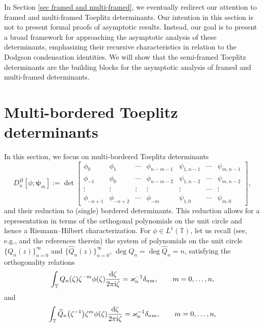 \documentclass[10pt,a4paper]{amsart}
\numberwithin{equation}{section}
\newcommand{\T}{{\mathbb T}}
\newcommand{\de}{\delta}
\newcommand{\ze}{\zeta}
\newcommand{\ii}{{\rm i}}
\newcommand{\dd}{{\rm d}}
\begin{document}
	
	In Section \ref{sec framed and multi-framed}, we eventually redirect our attention to framed and multi-framed Toeplitz determinants. Our intention in this section is not to present formal proofs of asymptotic results. Instead, our goal is to present a broad framework for approaching the asymptotic analysis of these determinants, emphasizing their recursive characteristics in relation to the Dodgson condensation identities. We will show that the semi-framed Toeplitz determinants are the building blocks for the asymptotic analysis of framed and multi-framed determinants.
	

\section{Multi-bordered Toeplitz determinants} \label{sec bordered}
	In this section, we focus on multi-bordered Toeplitz determinants
	\begin{equation}\label{btdmulti}
		D^B_n[\phi;\boldsymbol{\psi}_m] := \det \begin{bmatrix}
			\phi_0& \phi_{1} & \cdots & \phi_{n-m-1} & \psi_{1,n-1} & \cdots & \psi_{m,n-1} \\
			\phi_{-1}& \phi_0 & \cdots & \phi_{n-m-2} & \psi_{1,n-2} & \cdots & \psi_{m,n-2} \\
			\vdots & \vdots & \vdots & \vdots & \vdots & \cdots & \vdots \\
			\phi_{-n+1} & \phi_{-n+2} & \cdots & \phi_{-m} & \psi_{1,0} & \cdots & \psi_{m,0}
		\end{bmatrix},
	\end{equation}
	and their reduction to (single) bordered determinants. This reduction allows for a representation in terms of the orthogonal polynomials on the unit circle and hence a Riemann--Hilbert characterization. For $\phi \in L^1(\T)$, let us recall (see, e.g., \cite{DIK} and the references therein) the system of polynomials on the unit circle $\{Q_n(z)\}^{\infty}_{n=0}$ and $\big\{\widehat{Q}_n(z)\big\}^{\infty}_{n=0}$, $\deg Q_n = \deg \widehat{Q}_n = n$, satisfying the orthogonality relations
	\begin{equation*}
		\int_{\T} Q_n(\ze)\ze^{-m}\phi(\ze)\frac{\dd \ze}{2\pi \ii \ze}=\varkappa^{-1}_n \de_{nm}, \qquad m =0, \dots,n,
	\end{equation*}
	and
	\begin{equation*}
		\int_{\T} \widehat{Q}_n\big(\ze^{-1}\big)\ze^{m}\phi(\ze)\frac{\dd \ze}{2\pi \ii \ze}=\varkappa^{-1}_n \de_{nm}, \qquad m =0, \dots,n,
	\end{equation*}
\end{document}
